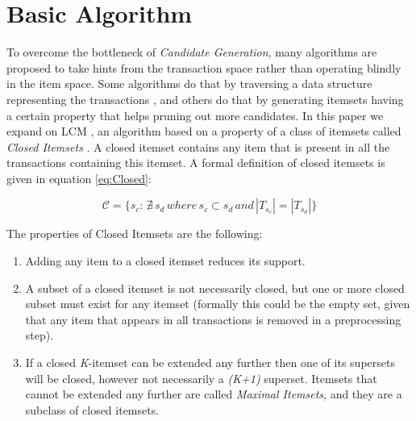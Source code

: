 \documentclass{sig-alternate}
\begin{document}
\section{Basic Algorithm}
\label{sec:lcm}
To overcome the bottleneck of \emph{Candidate Generation}, many algorithms are proposed to take hints from the transaction space rather than operating blindly in the item space. Some algorithms do that by traversing a data structure representing the transactions \cite{han2000mining}, and others do that by generating itemsets having %
a certain property that helps pruning out more candidates. In this paper we expand on LCM \cite{uno2004lcm}, an algorithm based on a property of a class of itemsets called \emph{Closed Itemsets} \cite{pasquier1999discovering}. A closed itemset contains any item that is present in all the transactions containing this itemset. A formal definition of closed itemsets is given in equation \ref{eq:Closed}: 

\begin{equation}\label{eq:Closed}\mathcal{C} = \{s_c:\, \nexists \, s_d \, where \, s_c  \subset s_d \, and \, |T_{s_c}| = |T_{s_d}|\}\end{equation}

The properties of Closed Itemsets are the following:
\begin{enumerate}
\item Adding any item to a closed itemset reduces its support. 
\item A subset of a closed itemset is not necessarily closed, but one or more closed subset must exist for any itemset (formally this could be the empty set, given that any item that appears in all transactions is removed in a preprocessing step). 
\item If a closed \emph{K}-itemset can be extended any further then one of its supersets will be closed, however not necessarily a \emph{(K+1)} superset. Itemsets that cannot be extended any further are called \emph{Maximal Itemsets}, and they are a subclass of closed itemsets.
\end{enumerate}
\end{document}
